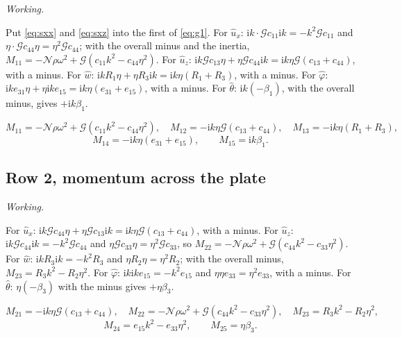 \documentclass[11pt,a4paper]{article}
\newif\ifshowworked \showworkedtrue
\newenvironment{worked}{\ifshowworked\par\smallskip\noindent\textit{Working.}\par\else\setbox0\vbox\bgroup\fi}{\ifshowworked\par\smallskip\else\egroup\fi}
\newcommand{\Nc}{\mathcal{N}}
\newcommand{\Gc}{\mathcal{G}}
\newcommand{\ii}{\mathrm{i}}
\newcommand{\bx}{\hat u_x}
\newcommand{\bz}{\hat u_z}
\newcommand{\bw}{\hat w}
\newcommand{\bp}{\hat\varphi}
\newcommand{\bt}{\hat\theta}
\begin{document}
\begin{worked}
Put \eqref{eq:sxx} and \eqref{eq:sxz} into the first of \eqref{eq:g1}. For $\bx$: $\ii k\cdot\Gc c_{11}\ii k=-k^2\Gc c_{11}$
and $\eta\cdot\Gc c_{44}\eta=\eta^2\Gc c_{44}$; with the overall minus and the inertia,
$M_{11}=-\Nc\rho\omega^2+\Gc(c_{11}k^2-c_{44}\eta^2)$. For $\bz$: $\ii k\Gc c_{13}\eta+\eta\Gc c_{44}\ii k=\ii k\eta\Gc(c_{13}+c_{44})$,
with a minus. For $\bw$: $\ii kR_1\eta+\eta R_3\ii k=\ii k\eta(R_1+R_3)$, with a minus. For $\bp$:
$\ii k e_{31}\eta+\eta\ii k e_{15}=\ii k\eta(e_{31}+e_{15})$, with a minus. For $\bt$: $\ii k(-\beta_1)$, with
the overall minus, gives $+\ii k\beta_1$.
\end{worked}

\noindent
\begin{equation}\label{eq:row1}
M_{11}=-\Nc\rho\omega^2+\Gc(c_{11}k^2-c_{44}\eta^2),\quad
M_{12}=-\ii k\eta\Gc(c_{13}+c_{44}),\quad
M_{13}=-\ii k\eta(R_1+R_3),
\end{equation}
\begin{equation}\label{eq:row1b}
M_{14}=-\ii k\eta(e_{31}+e_{15}),\qquad M_{15}=\ii k\beta_1 .
\end{equation}

\subsection{Row 2, momentum across the plate}

\begin{worked}
For $\bx$: $\ii k\Gc c_{44}\eta+\eta\Gc c_{13}\ii k=\ii k\eta\Gc(c_{13}+c_{44})$, with a minus. For $\bz$:
$\ii k\Gc c_{44}\ii k=-k^2\Gc c_{44}$ and $\eta\Gc c_{33}\eta=\eta^2\Gc c_{33}$, so
$M_{22}=-\Nc\rho\omega^2+\Gc(c_{44}k^2-c_{33}\eta^2)$. For $\bw$: $\ii kR_3\ii k=-k^2R_3$ and $\eta R_2\eta=\eta^2R_2$;
with the overall minus, $M_{23}=R_3k^2-R_2\eta^2$. For $\bp$: $\ii k\ii ke_{15}=-k^2e_{15}$ and $\eta\eta e_{33}=\eta^2e_{33}$,
with a minus. For $\bt$: $\eta(-\beta_3)$ with the minus gives $+\eta\beta_3$.
\end{worked}

\noindent
\begin{equation}\label{eq:row2}
M_{21}=-\ii k\eta\Gc(c_{13}+c_{44}),\quad
M_{22}=-\Nc\rho\omega^2+\Gc(c_{44}k^2-c_{33}\eta^2),\quad
M_{23}=R_3k^2-R_2\eta^2,
\end{equation}
\begin{equation}\label{eq:row2b}
M_{24}=e_{15}k^2-e_{33}\eta^2,\qquad M_{25}=\eta\beta_3 .
\end{equation}
\end{document}
